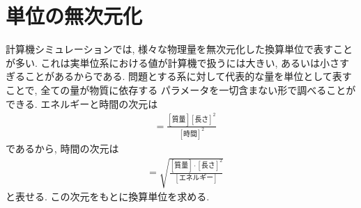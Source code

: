 \section{単位の無次元化}
計算機シミュレーションでは, 様々な物理量を無次元化した換算単位で表すことが多い.
これは実単位系における値が計算機で扱うには大きい, あるいは小さすぎることがあるからである.
問題とする系に対して代表的な量を単位として表すことで, 全ての量が物質に依存する
パラメータを一切含まない形で調べることができる.
エネルギーと時間の次元は
\begin{align}
  [\mathrm{エネルギー}]
&=\frac{[\mathrm{質量}][\mathrm{長さ}]^{2}}{[\mathrm{時間}]^2}
\end{align}
であるから, 時間の次元は
\begin{align}
  [\mathrm{時間}]
&=\sqrt{\frac{[\mathrm{質量}] \cdot [\mathrm{長さ}]^{2}}{[\mathrm{エネルギー}]}}
\end{align}
と表せる. この次元をもとに換算単位を求める.

